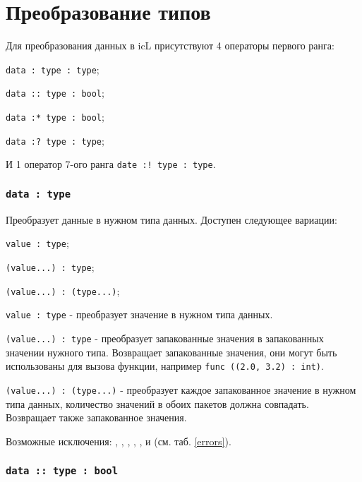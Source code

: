 \section{Преобразование типов}

Для преобразования данных в icL присутствуют 4 операторы первого ранга:
\begin{icItems}
	\item \texttt{data : type : type};
	\item \texttt{data :: type : bool};
	\item \texttt{data :* type : bool};
	\item \texttt{data :? type : type};
\end{icItems}

И 1 оператор 7-ого ранга \texttt{date :! type : type}.

\subsubsection{\texttt{data : type}}

Преобразует данные в нужном типа данных. Доступен следующее вариации:
\begin{icItems}
	\item \texttt{value : type};
	\item \texttt{(value...) : type};
	\item \texttt{(value...) : (type...)};
\end{icItems}

\texttt{value : type} - преобразует значение в нужном типа данных.

\texttt{(value...) : type} - преобразует запакованные значения в запакованных значении нужного типа. Возвращает запакованные значения, они могут быть использованы для вызова функции, например \texttt{func ((2.0, 3.2) : int)}.

\texttt{(value...) : (type...)} - преобразует каждое запакованное значение в нужном типа данных, количество значений в обоих пакетов должна совпадать. Возвращает также запакованное значения.

Возможные исключения: , , , , ,  и  (см. таб. \ref{errors}).

\subsubsection{\texttt{data :: type : bool}}

